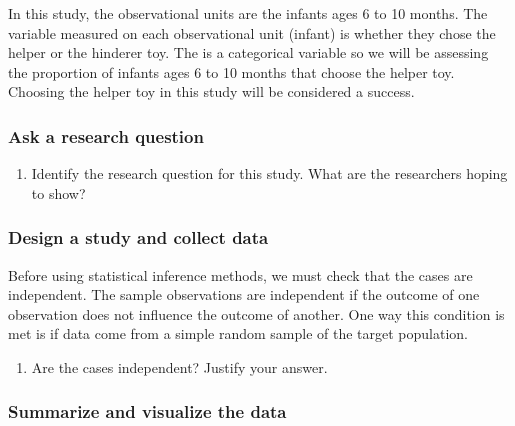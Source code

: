 \documentclass[
]{report}
\providecommand{\tightlist}{%
  \setlength{\itemsep}{0pt}\setlength{\parskip}{0pt}}
\begin{document}
In this study, the observational units are the infants ages 6 to 10 months. The variable measured on each observational unit (infant) is whether they chose the helper or the hinderer toy. The is a categorical variable so we will be assessing the proportion of infants ages 6 to 10 months that choose the helper toy. Choosing the helper toy in this study will be considered a success.

\hypertarget{ask-a-research-question}{%
\subsubsection*{Ask a research question}\label{ask-a-research-question}}

\begin{enumerate}
\def\labelenumi{\arabic{enumi}.}
\tightlist
\item
  Identify the research question for this study. What are the researchers hoping to show?
\end{enumerate}

\vspace{0.6in}

\hypertarget{design-a-study-and-collect-data}{%
\subsubsection*{Design a study and collect data}\label{design-a-study-and-collect-data}}

Before using statistical inference methods, we must check that the cases are independent. The sample observations are independent if the outcome of one observation does not influence the outcome of another. One way this condition is met is if data come from a simple random sample of the target population.

\begin{enumerate}
\def\labelenumi{\arabic{enumi}.}
\setcounter{enumi}{1}
\tightlist
\item
  Are the cases independent? Justify your answer.
\end{enumerate}

\vspace{0.8in}

\newpage

\hypertarget{summarize-and-visualize-the-data}{%
\subsubsection*{Summarize and visualize the data}\label{summarize-and-visualize-the-data}}
\end{document}

